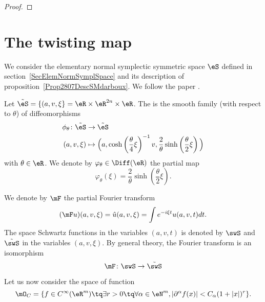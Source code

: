 \begin{proof}
\end{proof}


\section{The twisting map}

We consider the elementary normal symplectic symmetric space $\eS$ defined in section~\ref{SecElemNormSymplSpace} and its description of proposition~\ref{Prop2807DescSMdarboux}. We follow the paper \cite{QuantifKhalerian}.

Let $\tilde\eS=\{ (a,v,\xi \}=\eR\times\eR^{2n}\times\eR$. The  is the smooth family (with respect to $\theta$) of diffeomorphisms
\begin{equation}
	\begin{aligned}
		\phi_{\theta}\colon \tilde\eS&\to \tilde\eS \\
		(a,v,\xi)&\mapsto \Big( a,\cosh\left( \frac{ \theta }{ 4 }\xi \right)^{-1}v,\frac{ 2 }{ \theta }\sinh\left( \frac{ \theta }{ 2 }\xi \right) \Big)
	\end{aligned}
\end{equation}
with $\theta\in\eR$. We denote by $\varphi_{\theta}\in\Diff(\eR)$ the partial map
\begin{equation}
	\varphi_{\theta}(\xi)=\frac{ 2 }{ \theta }\sinh(\frac{ \theta }{ 2 }\xi).
\end{equation}

We denote by $\mF$ the partial Fourier transform
\begin{equation}
	(\mF u)(a,v,\xi)=\hat u(a,v,\xi)=\int e^{-i\xi t}u(a,v,t)dt.
\end{equation}
The space Schwartz functions in the variables $(a,v,t)$ is denoted by $\swS$ and $\tilde\swS$ in the variables $(a,v,\xi)$. By general theory, the Fourier transform is an isomorphism
\begin{equation}
	\mF\colon \swS\to \tilde\swS
\end{equation}

Let us now consider the space of function
\begin{equation}
	\mO_C=\{ f\in C^{\infty}(\eR^m)\tq \exists r>0\tq\forall\alpha\in\eN^m,| \partial^{\alpha}f(x) |<C_{\alpha}(1+| x |)^r \}.
\end{equation}

